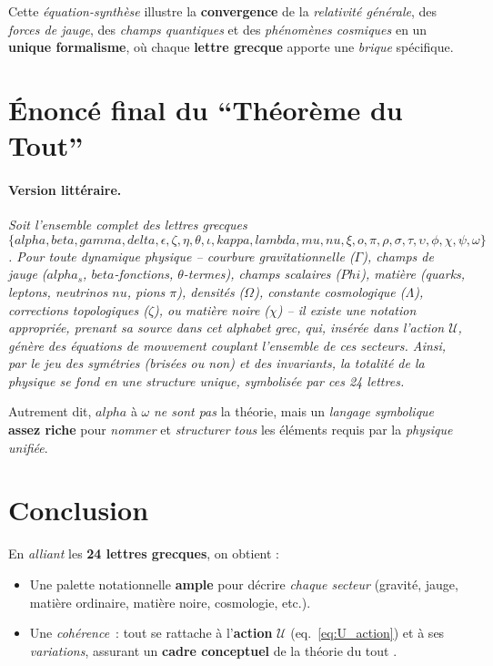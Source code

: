 \documentclass[12pt]{article}
\def\Phi{Phi}%
\def\kappa{kappa}%
\def\gamma{gamma}%
\def\delta{delta}%
\def\mu{mu}%
\def\nu{nu}%
\def\lambda{lambda}%
\def\alpha{alpha}%
\def\beta{beta}%
\begin{document}
Cette \emph{équation-synthèse} illustre la \textbf{convergence} de la \emph{relativité générale}, 
des \emph{forces de jauge}, des \emph{champs quantiques} et des \emph{phénomènes cosmiques} 
en un \textbf{unique formalisme}, où chaque \textbf{lettre grecque} apporte une \emph{brique} spécifique.

\section{Énoncé final du “Théorème du Tout”}

\paragraph{Version littéraire.}
\emph{Soit l’ensemble complet des lettres grecques 
\(\{\alpha,\beta,\gamma,\delta,\epsilon,\zeta,\eta,\theta,\iota,\kappa,\lambda,\mu,\nu,\xi,o,\pi,\rho,\sigma,\tau,\upsilon,\phi,\chi,\psi,\omega\}\). 
Pour toute dynamique physique -- courbure gravitationnelle (\(\Gamma\)), champs de jauge (\(\alpha_s\), \(\beta\)-fonctions, \(\theta\)-termes), champs scalaires (\(\Phi\)), matière (quarks, leptons, neutrinos \(\nu\), pions \(\pi\)), densités (\(\Omega\)), constante cosmologique (\(\Lambda\)), corrections topologiques (\(\zeta\)), ou matière noire (\(\chi\)) -- il existe une notation appropriée, prenant sa source dans cet \emph{alphabet grec}, qui, insérée dans l'action \(\mathcal{U}\), génère des équations de mouvement couplant l'ensemble de ces secteurs. Ainsi, par le jeu des symétries (brisées ou non) et des invariants, la totalité de la physique se fond en une structure unique, symbolisée par ces 24 lettres.}

\bigskip

Autrement dit, \(\alpha\) à \(\omega\) \emph{ne sont pas} la théorie, 
mais un \emph{langage symbolique} \textbf{assez riche} pour \emph{nommer} 
et \emph{structurer} \emph{tous} les éléments requis par la \emph{physique unifiée}.

\section{Conclusion}

En \emph{alliant} les \textbf{24 lettres grecques}, on obtient :
\begin{itemize}
    \item Une palette notationnelle \textbf{ample} pour décrire \emph{chaque secteur} 
          (gravité, jauge, matière ordinaire, matière noire, cosmologie, etc.).
    \item Une \emph{cohérence}~: tout se rattache à l'\textbf{action} \(\mathcal{U}\) (eq.~\ref{eq:U_action}) 
          et à ses \emph{variations}, 
          assurant un \textbf{cadre conceptuel} de la \og théorie du tout \fg.
\end{itemize}
\end{document}
